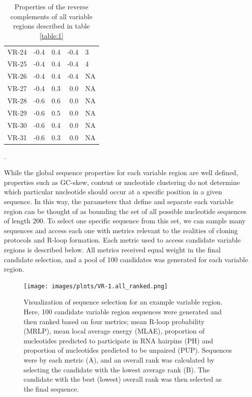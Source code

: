 \documentclass[11pt]{article}
\begin{document}
\begin{table}
\begin{tabular}{lrrrl}
	VR-24 &     -0.4 &         0.4 &     -0.4 &              3 \\
	VR-25 &     -0.4 &         0.4 &     -0.4 &              4 \\
	VR-26 &     -0.4 &         0.4 &     -0.4 &             NA \\
	VR-27 &     -0.4 &         0.3 &      0.0 &             NA \\
	VR-28 &     -0.6 &         0.6 &      0.0 &             NA \\
	VR-29 &     -0.6 &         0.5 &      0.0 &             NA \\
	VR-30 &     -0.6 &         0.4 &      0.0 &             NA \\
	VR-31 &     -0.6 &         0.3 &      0.0 &             NA \\
	\bottomrule
	
\end{tabular}
\caption{Properties of the reverse complements of all variable regions described in table \ref{table:1}}.
\label{table:2}
\end{table}

While the global sequence properties for each variable region are well defined, properties such as GC-skew, content or nucleotide clustering do not determine which particular nucleotide should occur at a specific position in a given sequence. In this way, the parameters that define and separate each variable region can be thought of as bounding the set of all possible nucleotide sequences of length 200. To select one specific sequence from this set, we can sample many sequences and access each one with metrics relevant to the realities of cloning protocols and R-loop formation. Each metric used to access candidate variable regions is described below. All metrics received equal weight in the final candidate selection, and a pool of 100 candidates was generated for each variable region. 

\begin{figure}[H]
	\texttt{[image: images/plots/VR-1.all\_ranked.png]}
	\centering
	\caption{Visualization of sequence selection for an example variable region. Here, 100 candidate variable region sequences were generated and then ranked based on four metrics; mean R-loop probability (MRLP), mean local average energy (MLAE), proportion of nucleotides predicted to participate in RNA hairpins (PH) and proportion of nucleotides predicted to be unpaired (PUP). Sequences were by each metric (A), and an overall rank was calculated by selecting the candidate with the lowest average rank (B). The candidate with the best (lowest) overall rank was then selected as the final sequence.}
	\label{ranking}
\end{figure}
\end{document}
